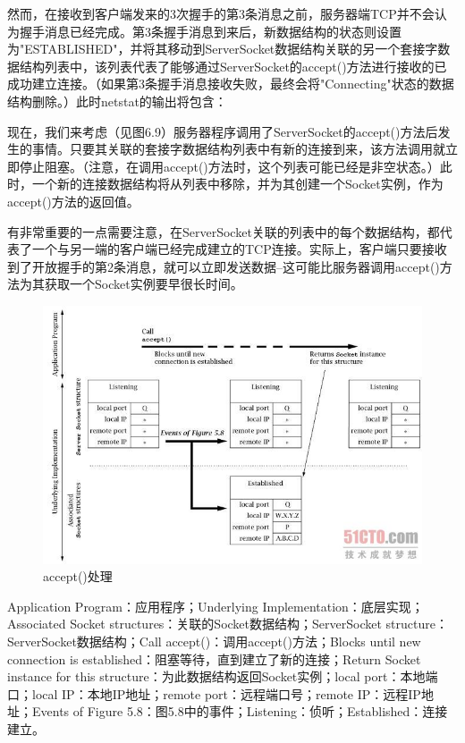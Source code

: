 		然而，在接收到客户端发来的3次握手的第3条消息之前，服务器端TCP并不会认为握手消息已经完成。第3条握手消息到来后，新数据结构的状态则设置为"ESTABLISHED"，并将其移动到ServerSocket数据结构关联的另一个套接字数据结构列表中，该列表代表了能够通过ServerSocket的accept()方法进行接收的已成功建立连接。（如果第3条握手消息接收失败，最终会将"Connecting"状态的数据结构删除。）此时netstat的输出将包含：

		

		现在，我们来考虑（见图6.9）服务器程序调用了ServerSocket的accept()方法后发生的事情。只要其关联的套接字数据结构列表中有新的连接到来，该方法调用就立即停止阻塞。（注意，在调用accept()方法时，这个列表可能已经是非空状态。）此时，一个新的连接数据结构将从列表中移除，并为其创建一个Socket实例，作为accept()方法的返回值。

		有非常重要的一点需要注意，在ServerSocket关联的列表中的每个数据结构，都代表了一个与另一端的客户端已经完成建立的TCP连接。实际上，客户端只要接收到了开放握手的第2条消息，就可以立即发送数据--这可能比服务器调用accept()方法为其获取一个Socket实例要早很长时间。

		\clearpage

		\begin{figure}[htbp]%
			\centering
			\includegraphics[scale=.6]{img/06.09.jpg}
			\caption{accept()处理}
			\label{fig:accept.process}
		\end{figure}

		Application Program：应用程序；Underlying Implementation：底层实现；Associated Socket structures：关联的Socket数据结构；ServerSocket structure：ServerSocket数据结构；Call accept()：调用accept()方法；Blocks until new connection is established：阻塞等待，直到建立了新的连接；Return Socket instance for this structure：为此数据结构返回Socket实例；local port：本地端口；local IP：本地IP地址；remote port：远程端口号；remote IP：远程IP地址；Events of Figure 5.8：图5.8中的事件；Listening：侦听；Established：连接建立。

